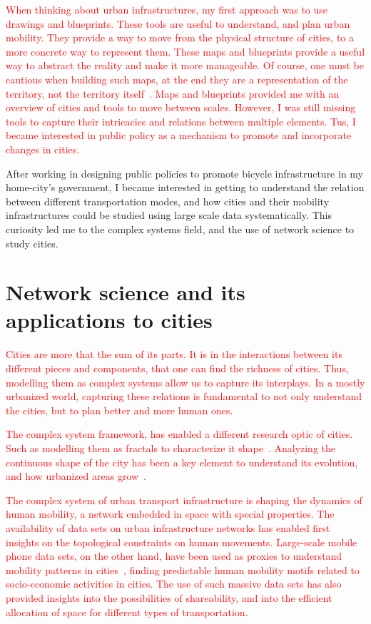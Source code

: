 \textcolor{red}{When thinking about urban infrastructures, my first approach was to use drawings and blueprints. These tools are useful to understand, and plan urban mobility. They provide a way to move from the physical structure of cities, to a more concrete way to represent them. These maps and blueprints provide a useful way to abstract the reality and make it more manageable. Of course, one must be cautious when building such maps, at the end they are a representation of the territory, not the territory itself~\cite{borges1961hacedor}. Maps and blueprints provided me with an overview of cities and tools to move between scales. However, I was still missing tools to capture their intricacies and relations between multiple elements. Tus, I became interested in public policy as a mechanism to promote and incorporate changes in cities.}

After working in designing public policies to promote bicycle infrastructure in my home-city's government, I became interested in getting to understand the relation between different transportation modes, and how cities and their mobility infrastructures could be studied using large scale data systematically. This curiosity led me to the complex systems field, and the use of network science to study cities.

\section{Network science and its applications to cities}

\textcolor{red}{Cities are more that the sum of its parts. It is in the interactions between its different pieces and components, that one can find the richness of cities. Thus, modelling them as complex systems allow us to capture its interplays. In a mostly urbanized world, capturing these relations is fundamental to not only understand the cities, but to plan better and more human ones.}

\textcolor{red}{The complex system framework, has enabled a different research optic of cities. Such as modelling them as fractals to characterize it shape~\cite{batty1996preliminary}. Analyzing the continuous shape of the city has been a key element to understand its evolution, and how urbanized areas grow~\cite{makse1995growth}.}

\textcolor{red}{The complex system of urban transport infrastructure is shaping the dynamics of human mobility, a network embedded in space with special properties. The availability of data sets on urban infrastructure networks has enabled first insights on the topological constraints on human movements. Large-scale mobile phone data sets, on the other hand, have been used as proxies to understand mobility patterns in cities~\cite{gonzalez2008understanding}, finding predictable human mobility motifs related to socio-economic activities in cities. The use of such massive data sets has also provided insights into the possibilities of shareability, and into the efficient allocation of space for different types of transportation.}


